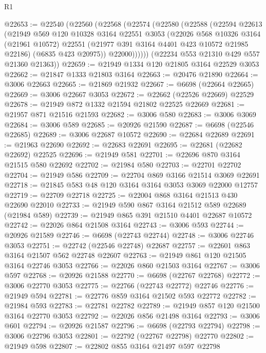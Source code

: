 \begin{lexlean}{R1}
\begin{coremodule}
@22653 := @22540
    (@22560
      (@22568
        (@22574
          (@22580
            (@22588
              (@22594
                @22613
                (@21949
                  @569
                  @120
                  @10328
                  @3164
                  @22551
                  @3053
                  (@22026
                    @568
                    @10326
                    @3164
                    (@21961 @10572)
                    @22551
                    (@21977 @391 @3164 @4401 @423 @10572 @21985 @22186)
                    (@6835 @423 @20975))
                  @22000))))))
      (@22234 @553 @21310 @429 @557 @21360 @21363))
@22659 := @21949 @1334 @120 @21805 @3164 @22529 @3053
@22662 := @21847 @1333 @21803 @3164
@22663 := @20476 @21890
@22664 := @3006 @22663
@22665 := @21869 @21932
@22667 := @6698 (@22664 @22665)
@22669 := @3006 @22667 @3053
@22672 := @22662 (@22526 @22669) @22529
@22678 := @21949 @872 @1332 @21594 @21802 @22525 @22669
@22681 := @21957 @871 @21516 @21593
@22682 := @3006 @580
@22683 := @3006 @3069
@22684 := @3006 @589
@22685 := @20926 @21590
@22687 := @6698 (@22546 @22685)
@22689 := @3006 @22687 @10572
@22690 := @22684 @22689
@22691 := @21963 @22690
@22692 := @22683 @22691
@22695 := @22681 (@22682 @22692) @22525
@22696 := @21949 @581
@22701 := @22696 @870 @3164 @21515 @580 @22692
@22702 := @21984 @580
@22703 := @22701 @22702
@22704 := @21949 @586
@22709 := @22704 @869 @3166 @21514 @3069 @22691
@22718 := @21845 @583 @48 @120 @3164 @3164 @3053 @3069 @22000 @12757
@22719 := @22709 @22718
@22725 := @22004 @868 @3164 @21513 @430 @22690 @22010
@22733 := @21949 @590 @867 @3164 @21512 @589 @22689 (@21984 @589)
@22739 := @21949 @865 @391 @21510 @4401 @22687 @10572
@22742 := @22026 @864 @21508 @3164
@22743 := @3006 @593
@22744 := @20926 @21589
@22746 := @6698 (@22743 @22744)
@22748 := @3006 @22746 @3053
@22751 := @22742 (@22546 @22748) @22687
@22757 := @22601 @863 @3164 @21507 @562 @22748 @22607
@22763 := @21949 @861 @120 @21505 @3164 @22746 @3053
@22766 := @22026 @860 @21503 @3164
@22767 := @3006 @597
@22768 := @20926 @21588
@22770 := @6698 (@22767 @22768)
@22772 := @3006 @22770 @3053
@22775 := @22766 (@22743 @22772) @22746
@22776 := @21949 @594
@22781 := @22776 @859 @3164 @21502 @593 @22772
@22782 := @21984 @593
@22783 := @22781 @22782
@22789 := @21949 @857 @120 @21500 @3164 @22770 @3053
@22792 := @22026 @856 @21498 @3164
@22793 := @3006 @601
@22794 := @20926 @21587
@22796 := @6698 (@22793 @22794)
@22798 := @3006 @22796 @3053
@22801 := @22792 (@22767 @22798) @22770
@22802 := @21949 @598
@22807 := @22802 @855 @3164 @21497 @597 @22798

\end{coremodule}
\end{lexlean}
